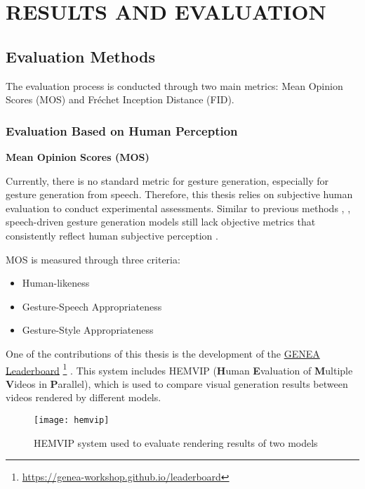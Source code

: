 \section{RESULTS AND EVALUATION}
\label{chap:evalution}

\subsection{Evaluation Methods}

The evaluation process is conducted through two main metrics: Mean Opinion Scores (MOS) and Fréchet Inception Distance (FID).

\subsubsection{Evaluation Based on Human Perception}

\textbf{Mean Opinion Scores (MOS)}

Currently, there is no standard metric for gesture generation, especially for gesture generation from speech. Therefore, this thesis relies on subjective human evaluation to conduct experimental assessments. 
Similar to previous methods \cite{yoon2022genea}, \cite{kucherenko2021large}, speech-driven gesture generation models still lack objective metrics that consistently reflect human subjective perception \cite{alexanderson2022listen}.

MOS is measured through three criteria:

\begin{itemize}
	\item Human-likeness
	\item Gesture-Speech Appropriateness
	\item Gesture-Style Appropriateness
\end{itemize}

One of the contributions of this thesis is the development of the \hyperlink{https://genea-workshop.github.io/leaderboard/}{GENEA Leaderboard} \footnote{ \url{https://genea-workshop.github.io/leaderboard} } \cite{nagy2024towards}. This system includes HEMVIP (\textbf{H}uman \textbf{E}valuation of \textbf{M}ultiple \textbf{V}ideos in \textbf{P}arallel), which is used to compare visual generation results between videos rendered by different models.

\begin{figure}[H]
	\centering
	\texttt{[image: hemvip]}
	\caption{HEMVIP system used to evaluate rendering results of two models}
\end{figure}

